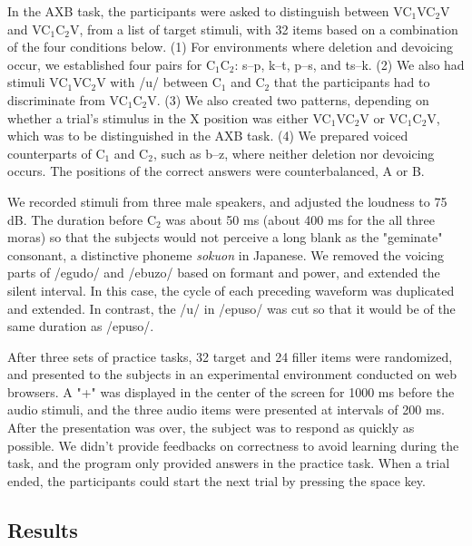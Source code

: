 \documentclass[a4paper,11pt,twocolumn]{article}
\begin{document}
In the AXB task, the participants were asked to distinguish between VC$_\text{1}$VC$_\text{2}$V and VC$_\text{1}$C$_\text{2}$V, from a list of target stimuli, with 32 items based on a combination of the four conditions below. (1) For environments where deletion and devoicing occur, we established four pairs for C$_\text{1}$C$_\text{2}$: s--p, k--t, p--s, and ts--k. (2) We also had stimuli VC$_\text{1}$VC$_\text{2}$V with /u/ between C$_\text{1}$ and C$_\text{2}$ that the participants had to discriminate from VC$_\text{1}$C$_\text{2}$V. (3) We also created two patterns, depending on whether a trial's stimulus in the X position was either VC$_\text{1}$VC$_\text{2}$V or VC$_\text{1}$C$_\text{2}$V, which was to be distinguished in the AXB task. (4) We prepared voiced counterparts of C$_\text{1}$ and C$_\text{2}$, such as b--z, where neither deletion nor devoicing occurs. The positions of the correct answers were counterbalanced, A or B.

We recorded stimuli from three male speakers, and adjusted the loudness to 75 dB. The duration before C$_\text{2}$ was about 50 ms (about 400 ms for the all three moras) so that the subjects would not perceive a long blank as the "geminate" consonant, a distinctive phoneme \textit{sokuon} in Japanese. We removed the voicing parts of /egudo/ and /ebuzo/ based on formant and power, and extended the silent interval. In this case, the cycle of each preceding waveform was duplicated and extended. In contrast, the /u/ in /epuso/ was cut so that it would be of the same duration as /epuso/.

After three sets of practice tasks, 32 target and 24 filler items were randomized, and presented to the subjects in an experimental environment conducted on web browsers. A "+" was displayed in the center of the screen for 1000 ms before the audio stimuli, and the three audio items were presented at intervals of 200 ms. After the presentation was over, the subject was to respond as quickly as possible. We didn't provide feedbacks on correctness to avoid learning during the task, and the program only provided answers in the practice task. When a trial ended, the participants could start the next trial by pressing the space key.

\subsection{Results}
\end{document}
